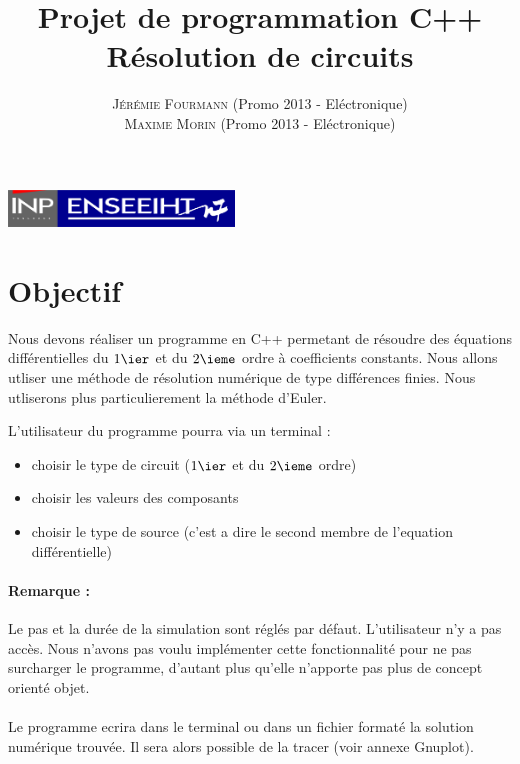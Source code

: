 \documentclass[a4paper,11pt]{article}
\title{\textbf{ \huge{Projet de programmation C++}}  \\{\Large  Résolution de circuits}}
\author{
\textsc{Jérémie Fourmann} (Promo 2013 - Eléctronique)\\ %
\textsc{Maxime Morin} (Promo 2013 - Eléctronique)\\ %
}
\begin{document}
\pagestyle{plain}

\maketitle
\begin{center}
\includegraphics[width=6cm]{inp-enseeiht.pdf}   
\end{center}

\vspace{1cm}
\renewcommand{\contentsname}{Plan}
\tableofcontents
\vspace{2cm}



\newpage



\section{Objectif}
Nous devons réaliser un programme en C++ permetant de résoudre des équations différentielles du $1\ier$ et du $2\ieme$ ordre à coefficients constants.
Nous allons utliser une méthode de résolution numérique de type différences finies. Nous utliserons plus particulierement la méthode d'Euler.

L'utilisateur du programme pourra via un terminal :
\begin{itemize}
 \item choisir le type de circuit ($1\ier$ et du $2\ieme$ ordre)
 \item choisir les valeurs des composants
 \item choisir le type de source (c'est a dire le second membre de l'equation différentielle)\\
\end{itemize}

\paragraph{Remarque : }Le pas et la durée de la simulation sont réglés par défaut. L'utilisateur n'y a pas accès. Nous n'avons pas voulu implémenter 
cette fonctionnalité pour ne pas surcharger le programme, d'autant plus qu'elle n'apporte pas plus de concept orienté objet. 


\paragraph{}Le programme ecrira dans le terminal ou dans un fichier formaté la solution numérique trouvée. 
Il sera alors possible de la tracer (voir annexe Gnuplot).\\
\end{document}
